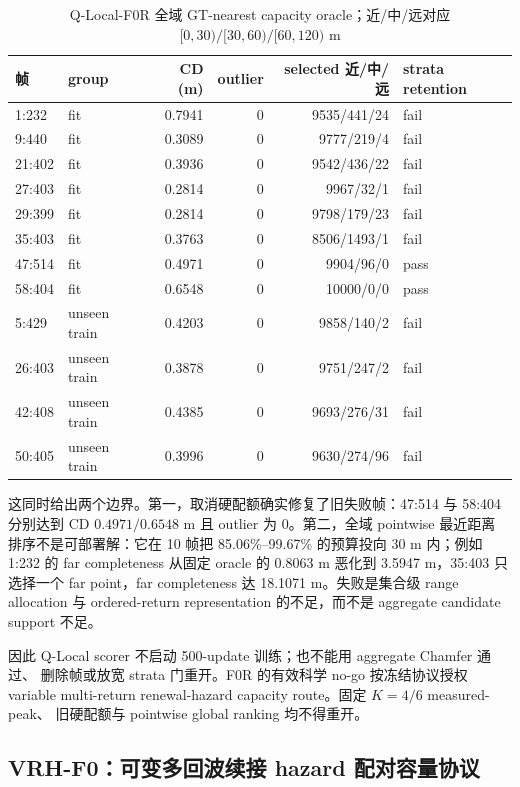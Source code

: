 \documentclass[11pt,a4paper,fontset=none]{ctexart}
\begin{document}
\begin{table}[H]
\centering
\scriptsize
\caption{Q-Local-F0R 全域 GT-nearest capacity oracle；近/中/远对应
$[0,30)/[30,60)/[60,120)$ m}
\begin{tabular}{llrrrl}
\toprule
帧 & group & CD (m) & outlier & selected 近/中/远 & strata retention \\
\midrule
1:232 & fit & 0.7941 & 0 & 9535/441/24 & fail \\
9:440 & fit & 0.3089 & 0 & 9777/219/4 & fail \\
21:402 & fit & 0.3936 & 0 & 9542/436/22 & fail \\
27:403 & fit & 0.2814 & 0 & 9967/32/1 & fail \\
29:399 & fit & 0.2814 & 0 & 9798/179/23 & fail \\
35:403 & fit & 0.3763 & 0 & 8506/1493/1 & fail \\
47:514 & fit & 0.4971 & 0 & 9904/96/0 & pass \\
58:404 & fit & 0.6548 & 0 & 10000/0/0 & pass \\
5:429 & unseen train & 0.4203 & 0 & 9858/140/2 & fail \\
26:403 & unseen train & 0.3878 & 0 & 9751/247/2 & fail \\
42:408 & unseen train & 0.4385 & 0 & 9693/276/31 & fail \\
50:405 & unseen train & 0.3996 & 0 & 9630/274/96 & fail \\
\bottomrule
\end{tabular}
\end{table}

这同时给出两个边界。第一，取消硬配额确实修复了旧失败帧：47:514 与 58:404
分别达到 CD $0.4971/0.6548$ m 且 outlier 为 0。第二，全域 pointwise 最近距离
排序不是可部署解：它在 10 帧把 85.06\%--99.67\% 的预算投向 30 m 内；例如
1:232 的 far completeness 从固定 oracle 的 0.8063 m 恶化到 3.5947 m，35:403
只选择一个 far point，far completeness 达 18.1071 m。失败是集合级 range
allocation 与 ordered-return representation 的不足，而不是 aggregate candidate
support 不足。

因此 Q-Local scorer 不启动 500-update 训练；也不能用 aggregate Chamfer 通过、
删除帧或放宽 strata 门重开。F0R 的有效科学 no-go 按冻结协议授权
variable multi-return renewal-hazard capacity route。固定 $K=4/6$ measured-peak、
旧硬配额与 pointwise global ranking 均不得重开。

\subsection{VRH-F0：可变多回波续接 hazard 配对容量协议}
\end{document}
